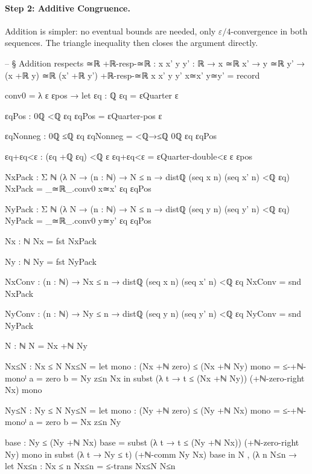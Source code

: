 \documentclass[11pt,a4paper]{book}
\begin{document}
\paragraph{Step 2: Additive Congruence.}
Addition is simpler: no eventual bounds are needed, only
$\varepsilon/4$-convergence in both sequences. The triangle
inequality then closes the argument directly.

\begin{code}
-- § Addition respects ≃ℝ
+ℝ-resp-≃ℝ : {x x' y y' : ℝ} → x ≃ℝ x' → y ≃ℝ y' → (x +ℝ y) ≃ℝ (x' +ℝ y')
+ℝ-resp-≃ℝ {x} {x'} {y} {y'} x≃x' y≃y' = record
  { conv0 = λ ε εpos →
      let
        εq : ℚ
        εq = εQuarter ε

        εqPos : 0ℚ <ℚ εq
        εqPos = εQuarter-pos ε

        εqNonneg : 0ℚ ≤ℚ εq
        εqNonneg = <ℚ→≤ℚ {0ℚ} {εq} εqPos

        εq+εq<ε : (εq +ℚ εq) <ℚ ε
        εq+εq<ε = εQuarter-double<ε ε εpos

        NxPack : Σ ℕ (λ N → (n : ℕ) → N ≤ n → distℚ (seq x n) (seq x' n) <ℚ εq)
        NxPack = _≃ℝ_.conv0 x≃x' εq εqPos

        NyPack : Σ ℕ (λ N → (n : ℕ) → N ≤ n → distℚ (seq y n) (seq y' n) <ℚ εq)
        NyPack = _≃ℝ_.conv0 y≃y' εq εqPos

        Nx : ℕ
        Nx = fst NxPack

        Ny : ℕ
        Ny = fst NyPack

        NxConv : (n : ℕ) → Nx ≤ n → distℚ (seq x n) (seq x' n) <ℚ εq
        NxConv = snd NxPack

        NyConv : (n : ℕ) → Ny ≤ n → distℚ (seq y n) (seq y' n) <ℚ εq
        NyConv = snd NyPack

        N : ℕ
        N = Nx +ℕ Ny

        Nx≤N : Nx ≤ N
        Nx≤N =
          let
            mono : (Nx +ℕ zero) ≤ (Nx +ℕ Ny)
            mono = ≤-+ℕ-monoˡ {a = zero} {b = Ny} z≤n Nx
          in
          subst (λ t → t ≤ (Nx +ℕ Ny)) (+ℕ-zero-right Nx) mono

        Ny≤N : Ny ≤ N
        Ny≤N =
          let
            mono : (Ny +ℕ zero) ≤ (Ny +ℕ Nx)
            mono = ≤-+ℕ-monoˡ {a = zero} {b = Nx} z≤n Ny

            base : Ny ≤ (Ny +ℕ Nx)
            base = subst (λ t → t ≤ (Ny +ℕ Nx)) (+ℕ-zero-right Ny) mono
          in
          subst (λ t → Ny ≤ t) (+ℕ-comm Ny Nx) base
      in
      N , (λ n N≤n →
        let
          Nx≤n : Nx ≤ n
          Nx≤n = ≤-trans Nx≤N N≤n

}
\end{code}
\end{document}
